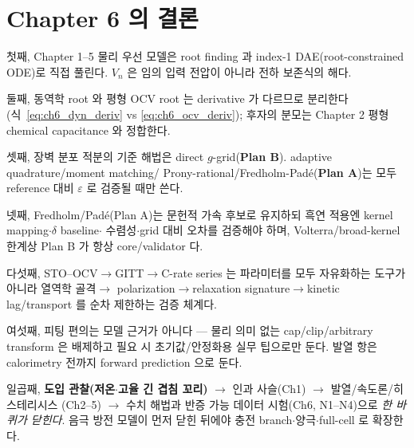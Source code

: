 \section{Chapter 6 의 결론}\label{sec:ch6_concl}
첫째, Chapter 1--5 물리 우선 모델은 root finding 과 index-1 DAE(root-constrained ODE)로 직접 풀린다. $V_n$ 은
임의 입력 전압이 아니라 전하 보존식의 해다.

둘째, 동역학 root 와 평형 OCV root 는 derivative 가 다르므로 분리한다(식~\eqref{eq:ch6_dyn_deriv} vs
\eqref{eq:ch6_ocv_deriv}); 후자의 분모는 Chapter 2 평형 chemical capacitance 와 정합한다.

셋째, 장벽 분포 적분의 기준 해법은 direct $g$-grid(\textbf{Plan B}). adaptive quadrature/moment matching/
Prony-rational/Fredholm-Padé(\textbf{Plan A})는 모두 reference 대비 $\varepsilon$ 로 검증될 때만 쓴다.

넷째, Fredholm/Padé(Plan A)는 문헌적 가속 후보로 유지하되 흑연 적용엔 kernel mapping$\cdot\delta$ baseline$\cdot$
수렴성$\cdot$grid 대비 오차를 검증해야 하며, Volterra/broad-kernel 한계상 Plan B 가 항상 core/validator 다.

다섯째, STO--OCV$\to$GITT$\to$C-rate series 는 파라미터를 모두 자유화하는 도구가 아니라 열역학 골격$\to$
polarization$\to$relaxation signature$\to$kinetic lag/transport 를 순차 제한하는 검증 체계다.

여섯째, 피팅 편의는 모델 근거가 아니다 — 물리 의미 없는 cap/clip/arbitrary transform 은 배제하고 필요 시
초기값/안정화용 실무 팁으로만 둔다. 발열 항은 calorimetry 전까지 forward prediction 으로 둔다.

일곱째, \textbf{도입 관찰(저온$\cdot$고율 긴 겹침 꼬리)} $\to$ 인과 사슬(Ch1) $\to$ 발열/속도론/히스테리시스
(Ch2--5) $\to$ 수치 해법과 반증 가능 데이터 시험(Ch6, N1--N4)으로 \emph{한 바퀴가 닫힌다}. 음극 방전 모델이
먼저 닫힌 뒤에야 충전 branch$\cdot$양극$\cdot$full-cell 로 확장한다.


